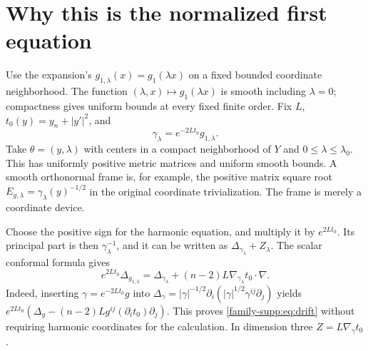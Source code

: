 \documentclass[11pt]{article}
\theoremstyle{definition}
\theoremstyle{remark}
\numberwithin{equation}{section}
\providecommand{\la}{\lambda}
\providecommand{\tht}{\theta}
\begin{document}
\section{Why this is the normalized first equation}\label{family-supp:sec:geometry}

Use the expansion's $g_{1,\la}(x)=g_1(\la x)$ on a fixed bounded coordinate
neighborhood. The function $(\la,x)\mapsto g_1(\la x)$ is smooth including
$\la=0$; compactness gives uniform bounds at every fixed finite order.
Fix $L$, $t_0(y)=y_n+|y'|^2$, and
\[
 \gamma_\la=e^{-2Lt_0}g_{1,\la}.
\]
Take $\tht=(y,\la)$ with centers in a compact neighborhood of $Y$ and
$0\leq\la\leq\la_0$. This has uniformly positive metric matrices and
uniform smooth bounds. A smooth orthonormal frame is, for example, the
positive matrix square root $E_{y,\la}=\gamma_\la(y)^{-1/2}$ in the original
coordinate trivialization. The frame is merely a coordinate device.

Choose the positive sign for the harmonic equation, and multiply it by
$e^{2Lt_0}$. Its principal part is then $\gamma_\la^{-1}$, and it can be
written as $\Delta_{\gamma_\la}+Z_\la$. The scalar conformal formula gives
\begin{equation}\label{family-supp:eq:drift}
 e^{2Lt_0}\Delta_{g_{1,\la}}
       =\Delta_{\gamma_\la}+(n-2)L\nabla_{\gamma_\la}t_0\cdot\nabla.
\end{equation}
Indeed, inserting $\gamma=e^{-2Lt_0}g$ into
$\Delta_\gamma=|\gamma|^{-1/2}\partial_i
(|\gamma|^{1/2}\gamma^{ij}\partial_j)$ yields
$e^{2Lt_0}(\Delta_g-(n-2)L g^{ij}(\partial_i t_0)\partial_j)$.
This proves \eqref{family-supp:eq:drift} without requiring harmonic coordinates for
the calculation. In dimension three $Z=L\nabla_\gamma t_0$.
\end{document}
